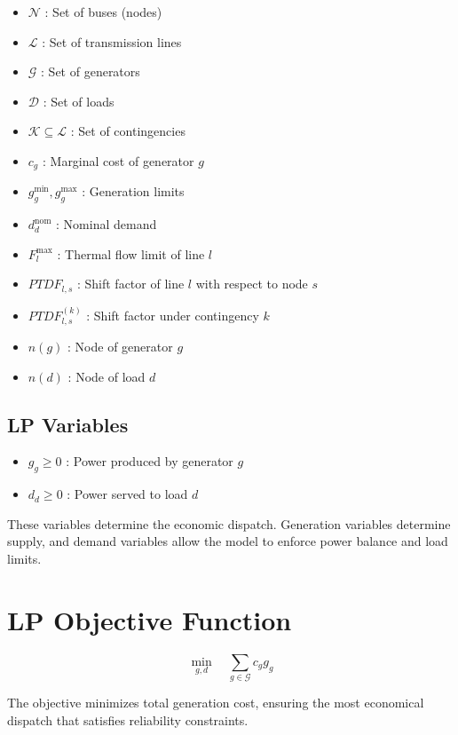 \documentclass[11pt]{article}
\begin{document}
\begin{itemize}
    \item $\mathcal{N}$ : Set of buses (nodes)
    \item $\mathcal{L}$ : Set of transmission lines
    \item $\mathcal{G}$ : Set of generators
    \item $\mathcal{D}$ : Set of loads
    \item $\mathcal{K} \subseteq \mathcal{L}$ : Set of contingencies
    \item $c_g$ : Marginal cost of generator $g$
    \item $g_g^{\min}, g_g^{\max}$ : Generation limits
    \item $d_d^{\text{nom}}$ : Nominal demand
    \item $F_l^{\max}$ : Thermal flow limit of line $l$
    \item $PTDF_{l,s}$ : Shift factor of line $l$ with respect to node $s$
    \item $PTDF_{l,s}^{(k)}$ : Shift factor under contingency $k$
    \item $n(g)$ : Node of generator $g$
    \item $n(d)$ : Node of load $d$
\end{itemize}

\subsection{LP Variables}

\begin{itemize}
    \item $g_g \ge 0$ : Power produced by generator $g$
    \item $d_d \ge 0$ : Power served to load $d$
\end{itemize}

 
These variables determine the economic dispatch. Generation variables determine supply, and demand variables allow the model to enforce power balance and load limits.

\section*{LP Objective Function}

\begin{equation}
\min_{g,d} \quad \sum_{g \in \mathcal{G}} c_g g_g
\end{equation}

 
The objective minimizes total generation cost, ensuring the most economical dispatch that satisfies reliability constraints.
\end{document}
